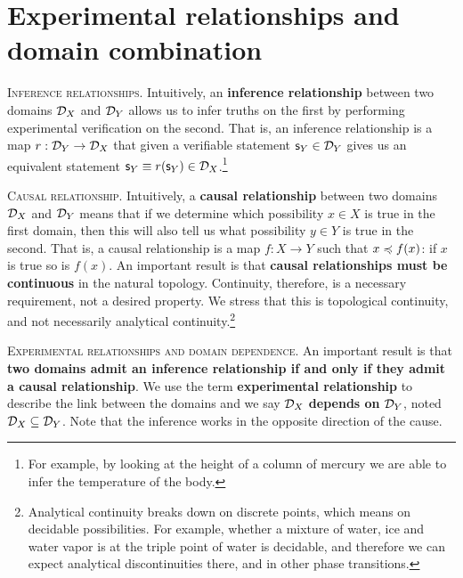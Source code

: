 \documentclass[10pt,twocolumn, nofootinbib]{revtex4-1}
\newcommand\partitle[1]{\textsc{#1}.}
\begin{document}
\section{Experimental relationships and domain combination}

\partitle{Inference relationships} Intuitively, an \textbf{ inference relationship} between two domains $\mathcal{D}_X$ and $\mathcal{D}_Y$ allows us to infer truths on the first by performing experimental verification on the second. That is, an inference relationship is a map $r : \mathcal{D}_Y \to \mathcal{D}_X$ that given a verifiable statement $\mathsf{s}_Y \in \mathcal{D}_Y$ gives us an equivalent statement $\mathsf{s}_Y \equiv r(\mathsf{s}_Y) \in \mathcal{D}_X$.\footnote{For example, by looking at the height of a column of mercury we are able to infer the temperature of the body.}

\partitle{Causal relationship} Intuitively, a \textbf{causal relationship} between two domains $\mathcal{D}_X$ and $\mathcal{D}_Y$ means that if we determine which possibility $x \in X$ is true in the first domain, then this will also tell us what possibility $y \in Y$ is true in the second. That is, a causal relationship is a map $f : X \to Y$ such that $x \preccurlyeq f(x)$: if $x$ is true so is $f(x)$. An important result is that \textbf{causal relationships must be continuous} in the natural topology. Continuity, therefore, is a necessary requirement, not a desired property. We stress that this is topological continuity, and not necessarily analytical continuity.\footnote{Analytical continuity breaks down on discrete points, which means on decidable possibilities. For example, whether a mixture of water, ice and water vapor is at the triple point of water is decidable, and therefore we can expect analytical discontinuities there, and in other phase transitions.}

\partitle{Experimental relationships and domain dependence} An important result is that \textbf{two domains admit an inference relationship if and only if they admit a causal relationship}. We use the term \textbf{experimental relationship} to describe the link between the domains and we say $\mathcal{D}_X$ \textbf{depends on} $\mathcal{D}_Y$, noted $\mathcal{D}_X \subseteq \mathcal{D}_Y$. Note that the inference works in the opposite direction of the cause.
\end{document}
